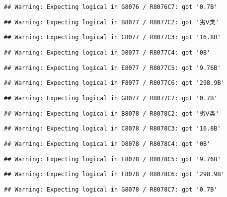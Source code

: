 \documentclass[
]{article}
\begin{document}
\begin{verbatim}
## Warning: Expecting logical in G8076 / R8076C7: got '0.7B'
\end{verbatim}

\begin{verbatim}
## Warning: Expecting logical in B8077 / R8077C2: got '劣Ⅴ类'
\end{verbatim}

\begin{verbatim}
## Warning: Expecting logical in C8077 / R8077C3: got '16.8B'
\end{verbatim}

\begin{verbatim}
## Warning: Expecting logical in D8077 / R8077C4: got '0B'
\end{verbatim}

\begin{verbatim}
## Warning: Expecting logical in E8077 / R8077C5: got '9.76B'
\end{verbatim}

\begin{verbatim}
## Warning: Expecting logical in F8077 / R8077C6: got '298.9B'
\end{verbatim}

\begin{verbatim}
## Warning: Expecting logical in G8077 / R8077C7: got '0.7B'
\end{verbatim}

\begin{verbatim}
## Warning: Expecting logical in B8078 / R8078C2: got '劣Ⅴ类'
\end{verbatim}

\begin{verbatim}
## Warning: Expecting logical in C8078 / R8078C3: got '16.8B'
\end{verbatim}

\begin{verbatim}
## Warning: Expecting logical in D8078 / R8078C4: got '0B'
\end{verbatim}

\begin{verbatim}
## Warning: Expecting logical in E8078 / R8078C5: got '9.76B'
\end{verbatim}

\begin{verbatim}
## Warning: Expecting logical in F8078 / R8078C6: got '298.9B'
\end{verbatim}

\begin{verbatim}
## Warning: Expecting logical in G8078 / R8078C7: got '0.7B'
\end{verbatim}
\end{document}
